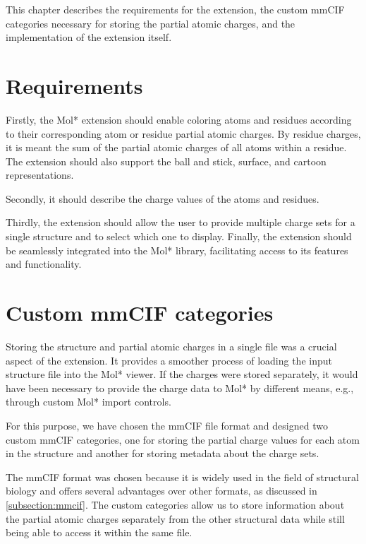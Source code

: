 \documentclass[
  digital,     %
  oneside,     %
  nosansbold,  %
  nocolorbold, %
  lof,         %
  lot,         %
]{fithesis4}
\begin{document}
This chapter describes the requirements for the extension, the custom mmCIF categories necessary for storing the partial atomic charges, and the implementation of the extension itself.

\section{Requirements}
\label{section:requirements}

Firstly, the Mol* extension should enable coloring atoms and residues according to their corresponding atom or residue partial atomic charges. By residue charges, it is meant the sum of the partial atomic charges of all atoms within a residue. The extension should also support the ball and stick, surface, and cartoon representations.

Secondly, it should describe the charge values of the atoms and residues.

Thirdly, the extension should allow the user to provide multiple charge sets for a single structure and to select which one to display. Finally, the extension should be seamlessly integrated into the Mol* library, facilitating access to its features and functionality.

\section{Custom mmCIF categories}
\label{section:custom_mmcif_categories}

Storing the structure and partial atomic charges in a single file was a crucial aspect of the extension. It provides a smoother process of loading the input structure file into the Mol* viewer. If the charges were stored separately, it would have been necessary to provide the charge data to Mol* by different means, e.g., through custom Mol* import controls.

For this purpose, we have chosen the mmCIF file format and designed two custom mmCIF categories, one for storing the partial charge values for each atom in the structure and another for storing metadata about the charge sets.

The mmCIF format was chosen because it is widely used in the field of structural biology and offers several advantages over other formats, as discussed in \ref{subsection:mmcif}. The custom categories allow us to store information about the partial atomic charges separately from the other structural data while still being able to access it within the same file.
\end{document}

